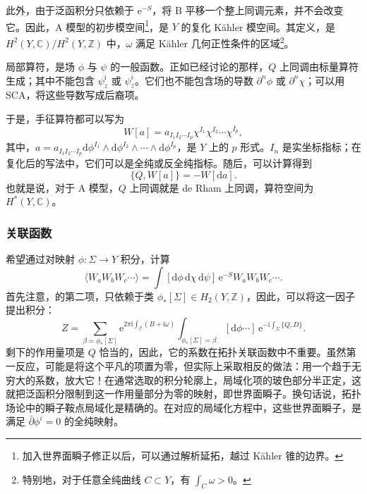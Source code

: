 此外，由于泛函积分只依赖于 $\mathrm{e}^{-S}$，将 B 平移一个整上同调元素，并不会改变它。因此，A 模型的初步模空间\footnote{加入世界面瞬子修正以后，可以通过解析延拓，越过 K\"ahler 锥的边界。}，是 $Y$ 的复化 K\"ahler 模空间。其定义，是 $H^2(Y,\mathbb{C})/H^2(Y,\mathbb{Z})$ 中，$\omega$ 满足 K\"ahler 几何正性条件的区域\footnote{特别地，对于任意全纯曲线 $C\subset Y$，有 $\int_C\omega>0$。}。

局部算符，是场 $\phi$ 与 $\psi$ 的一般函数。正如已经讨论的那样，$Q$ 上同调由标量算符生成；其中不能包含 $\psi_z^{\bar\imath}$ 或 $\psi_{\bar z}^i$。它们也不能包含场的导数 $\partial^n\phi$ 或 $\partial^n\chi$；可以用 SCA，将这些导数写成后裔项。

于是，手征算符都可以写为
\begin{equation}\label{eq:3.118}
W[a]=a_{I_1I_2\cdots I_p}\chi^{I_1}\chi^{I_2}\cdots\chi^{I_p},
\end{equation}
其中，$a=a_{I_1I_2\cdots I_p}\mathrm{d}\phi^{I_1}\wedge\mathrm{d}\phi^{I_2}\wedge\cdots\wedge\mathrm{d}\phi^{I_p}$，是 $Y$ 上的 $p$ 形式。$I_n$ 是实坐标指标；在复化后的写法中，它们可以是全纯或反全纯指标。随后，可以计算得到
\begin{equation}\label{eq:3.119}
\{Q,W[a]\}=-W[\mathrm{d}a].
\end{equation}
也就是说，对于 A 模型，$Q$ 上同调就是 de Rham 上同调，算符空间为 $H^*(Y,\mathbb{C})$。

\subsubsection{关联函数}\label{sec:3.4.1.1}

希望通过对映射 $\phi\colon\Sigma\to Y$ 积分，计算
\begin{equation}\label{eq:3.120}
\langle W_aW_bW_c\cdots\rangle
=\int[\mathrm{d}\phi\,\mathrm{d}\chi\,\mathrm{d}\psi]\,
\mathrm{e}^{-S}W_aW_bW_c\cdots.
\end{equation}
首先注意，的第二项，只依赖于类 $\phi_*[\Sigma]\in H_2(Y,\mathbb{Z})$，因此，可以将这一因子提出积分：
\[
Z=\sum_{\beta=\phi_*[\Sigma]}
\mathrm{e}^{2\pi\mathrm{i}\int_\beta(B+\mathrm{i}\omega)}
\int_{\phi_*[\Sigma]=\beta}[\mathrm{d}\phi\cdots]\,
\mathrm{e}^{-\mathrm{i}\int_\Sigma\{Q,D\}}.
\]
剩下的作用量项是 $Q$ 恰当的，因此，它的系数在拓扑关联函数中不重要。虽然第一反应，可能是将这个平凡的项置为零，但实际上采取相反的做法：用一个趋于无穷大的系数，放大它！在通常选取的积分轮廓上，局域化项的玻色部分半正定，这就把泛函积分限制到这一作用量部分为零的映射，即世界面瞬子。换句话说，拓扑场论中的瞬子鞍点局域化是精确的。在对应的局域化方程中，这些世界面瞬子，是满足 $\bar\partial\phi^i=0$ 的全纯映射。

